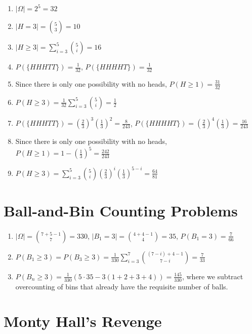 \documentclass{article}
\begin{document}
\begin{enumerate}
    \item \(|\Omega| = 2^5 = 32\)
    \item \(|H = 3| = \binom{5}{3} = 10\)
    \item \(|H \geqslant 3| = \sum_{i = 3}^5 \binom{5}{i} = 16\)
    \item \(P(\{HHHTT\}) = \frac{1}{32}\), \(P(\{HHHHT\}) = \frac{1}{32}\)
    \item Since there is only one possibility with no heads, \(P(H \geqslant 1) = \frac{31}{32}\)
    \item \(P(H \geqslant 3) = \frac{1}{32} \sum_{i = 3}^5 \binom{5}{i} = \frac{1}{2}\)
    \item \(P(\{HHHTT\}) = \left(\frac{2}{3}\right)^3 \left(\frac{1}{3}\right)^2 = \frac{8}{243}\), \(P(\{HHHHT\}) = \left(\frac{2}{3}\right)^4 \left(\frac{1}{3}\right) = \frac{16}{243}\)
    \item Since there is only one possibility with no heads, \(P(H \geqslant 1) = 1 - \left(\frac{1}{3}\right)^5 = \frac{242}{243}\)
    \item \(P(H \geqslant 3) = \sum_{i = 3}^5 \binom{5}{i} \left(\frac{2}{3}\right)^i \left(\frac{1}{3}\right)^{5 - i} = \frac{64}{81}\)
\end{enumerate}

\section{Ball-and-Bin Counting Problems}

\begin{enumerate}
    \item \(|\Omega| = \binom{7 + 5 - 1}{7} = 330\), \(|B_1 = 3| = \binom{4 + 4 - 1}{4} = 35\), \(P(B_1 = 3) = \frac{7}{66}\)
    \item \(P(B_1 \geqslant 3) = P(B_3 \geqslant 3) = \frac{1}{330} \sum_{i = 3}^7 \binom{(7 - i) + 4 - 1}{7 - i} = \frac{7}{33}\)
    \item \(P(B_n \geqslant 3) = \frac{1}{330} \left(5 \cdot 35 - 3(1 + 2 + 3 + 4)\right) = \frac{145}{330}\), where we subtract overcounting of bins that already have the requisite number of balls.
\end{enumerate}

\section{Monty Hall's Revenge}

\subsection{}
\end{document}
